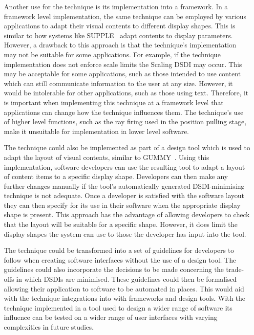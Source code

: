 \documentclass[review,5p,times,twocolumn]{elsarticle}
\begin{document}
Another use for the technique is its implementation into a framework.
In a framework level implementation, the same technique can be employed by various applications to adapt their visual contents to different display shapes.
This is similar to how systems like SUPPLE~\cite{Gajos2004} adapt contents to display parameters.
However, a drawback to this approach is that the technique's implementation may not be suitable for some applications.  
For example, if the technique implementation does not enforce scale limits the Scaling \ac{DSDI} may occur.
This may be acceptable for some applications, such as those intended to use content which can still communicate information to the user at any size.
However, it would be intolerable for other applications, such as those using text.
Therefore, it is important when implementing this technique at a framework level that applications can change how the technique influences them.
The technique's use of higher level functions, such as the ray firing used in the position pulling stage, make it unsuitable for implementation in lower level software.

The technique could also be implemented as part of a design tool which is used to adapt the layout of visual contents, similar to GUMMY~\cite{Meskens2008}.
Using this implementation, software developers can use the resulting tool to adapt a layout of content items to a specific display shape.
Developers can then make any further changes manually if the tool's automatically generated \ac{DSDI}-minimising technique is not adequate.
Once a developer is satisfied with the software layout they can then specify for its use in their software when the appropriate display shape is present.
This approach has the advantage of allowing developers to check that the layout will be suitable for a specific shape.
However, it does limit the display shapes the system can use to those the developer has input into the tool.

The technique could be transformed into a set of guidelines for developers to follow when creating software interfaces without the use of a design tool.
The guidelines could also incorporate the decisions to be made concerning the trade-offs in which \acp{DSDI} are minimised.
These guidelines could then be formalised~\cite{Ngo2000} allowing their application to software to be automated in places.
This would aid with the technique integrations into with frameworks and design tools.
With the technique implemented in a tool used to design a wider range of software its influence can be tested on a wider range of user interfaces with varying complexities in future studies.
\end{document}
